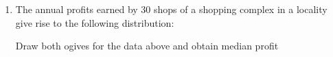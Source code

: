 \renewcommand{\theequation}{\theenumi}
\begin{enumerate}[label=\arabic*.,ref=\thesubsection.\theenumi]
\item The annual profits earned by 30 shops of a shopping complex in a locality give rise to  the following distribution:
\begin{table}[!ht]
	\centering
	
\end{table}
Draw both ogives for the data above and obtain median profit
\end{enumerate}